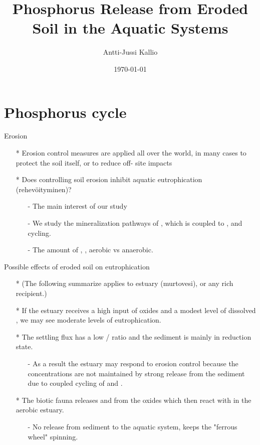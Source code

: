 \documentclass{beamer}
\title{Phosphorus Release from Eroded Soil in the Aquatic Systems}
\date{\today}
\author{Antti-Jussi Kallio}
\institute{University of Helsinki}
\begin{document}
  \maketitle
  \section{Phosphorus cycle}
  \begin{frame}{Erosion}
    \begin{itemize}
    \item[*] Erosion control measures are applied all over the 			world,
    in many cases to protect the soil itself, or to reduce off-			site impacts  
    \item[*] Does controlling soil erosion inhibit aquatic 				eutrophication (rehev{\"o}ityminen)?
      \begin{itemize}
        \item[-] The main interest of our study
        \item[-] We study the mineralization pathways of , 			which is coupled to ,  and  cycling.
        \item[-] The amount of , , aerobic vs 					anaerobic.
      \end{itemize}
    \end{itemize}
  \end{frame}
  \begin{frame}{Possible effects of eroded soil on eutrophication}
    \begin{itemize}
      \item[*] \small{(The following summarize applies to estuary 				  (murtovesi), or any  rich recipient.)}
      \item[*] If the estuary receives a high input of  			  oxides and a modest level of dissolved , we may see 		  moderate levels of eutrophication.
      \item[*] The settling flux has a low / ratio 		  and the sediment is mainly in  reduction state.
      \begin{itemize}
        \item[-] As a result the estuary may respond to erosion control because the  concentrations are not maintained by strong  release from the sediment due to coupled cycling of  and . 
	  \end{itemize}
	  \item[*] The biotic fauna releases  and  from the oxides which then react with  in the aerobic estuary.
	  \begin{itemize}
		\item[-] No  release from sediment to the aquatic system, keeps the "ferrous wheel" spinning.	
	  \end{itemize}	        
    \end{itemize}
  \end{frame}
  
\end{document}
